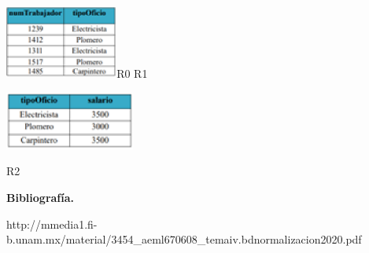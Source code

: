 \documentclass{article} %
\begin{document}
\noindent \includegraphics*[width=1.46in, height=0.95in, keepaspectratio=false]{image7}R0  R1

\noindent 

\noindent 

\noindent \includegraphics*[width=1.68in, height=0.75in, keepaspectratio=false]{image8}

       R2 

\noindent 

\noindent 

\noindent 

\noindent \textbf{Bibliograf\'{i}a.}

\noindent http://mmedia1.fi-b.unam.mx/material/3454\_aeml670608\_temaiv.bdnormalizacion2020.pdf
\end{document}
